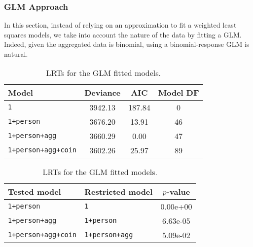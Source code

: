 \documentclass[a4paper, 12pt,oneside]{article}
\begin{document}
			\subsubsection{GLM Approach}
			In this section, instead of relying on an approximation to fit a weighted least squares models, we take into account the nature of the data by fitting a GLM. Indeed, given the aggregated data is binomial, using a binomial-response GLM is natural. 
			\begin{table}[htb]
				\centering
				\begin{subtable}{\textwidth}
					\centering
					\caption{Analysis of deviance of the GLM \texttt{1+person+agg+coin} model and AIC values.}
					\label{tab:glm-model-comparison}
					\begin{tabular}{lccc}
					\toprule
					Model & Deviance & AIC & Model DF \\
					\midrule
					\texttt{1} & 3942.13 & 187.84 & 0 \\
					\texttt{1+person} & 3676.20 & 13.91 & 46 \\
					\texttt{1+person+agg} & 3660.29 & 0.00 & 47 \\
					\texttt{1+person+agg+coin} & 3602.26 & 25.97 & 89 \\
					\bottomrule
					\end{tabular}
				\end{subtable}

				\begin{subtable}{\textwidth}
					\centering
					\caption{LRTs for the GLM fitted models.}
					\label{tab:glm-lrt-comparison}
					\begin{tabular}{llc}
					\toprule
					Tested model & Restricted model & $p$-value \\
					\midrule
					\texttt{1+person} & \texttt{1} & 0.00e+00 \\
					\texttt{1+person+agg} & \texttt{1+person} & 6.63e-05 \\
					\texttt{1+person+agg+coin} & \texttt{1+person+agg} & 5.09e-02 \\
					\bottomrule
					\end{tabular}
				\end{subtable}
			\end{table}
\end{document}
